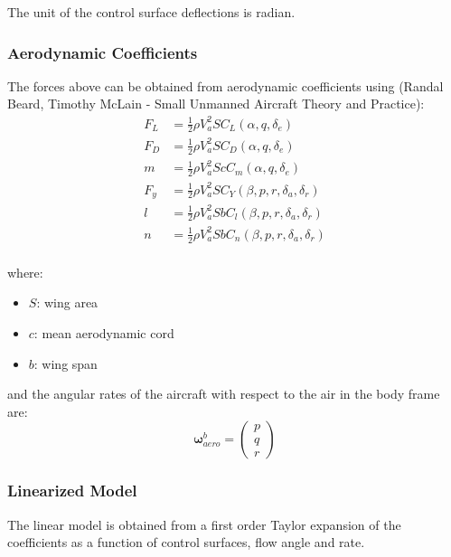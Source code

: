 \documentclass[a4paper]{paper}
\begin{document}
The unit of the control surface deflections is radian.

\subsubsection{Aerodynamic Coefficients}

The forces above can be obtained from aerodynamic coefficients using (Randal Beard, Timothy McLain - Small Unmanned Aircraft Theory and Practice):
\begin{equation}
\begin{split}
    F_L &= \frac{1}{2} \rho V_a^2 S C_L(\alpha, q, \delta_e) \\
    F_D &= \frac{1}{2} \rho V_a^2 S C_D(\alpha, q, \delta_e) \\
    m &= \frac{1}{2} \rho V_a^2 S c C_m(\alpha, q, \delta_e) \\
    F_y &= \frac{1}{2} \rho V_a^2 S C_Y(\beta, p, r, \delta_a, \delta_r) \\
    l &= \frac{1}{2} \rho V_a^2 S b C_l(\beta, p, r, \delta_a, \delta_r) \\
    n &= \frac{1}{2} \rho V_a^2 S b C_n(\beta, p, r, \delta_a, \delta_r) \\
\end{split}
\end{equation}

where:
\begin{itemize}
    \item $S$: wing area
    \item $c$: mean aerodynamic cord
    \item $b$: wing span
\end{itemize}
and the angular rates of the aircraft with respect to the air in the body frame are:
\begin{equation}
    \bm \omega_{aero}^b = \left(\begin{matrix}
    p\\ q \\ r
    \end{matrix}\right)
\end{equation}

\subsubsection{Linearized Model}

The linear model is obtained from a first order Taylor expansion of the coefficients as a function of control surfaces, flow angle and rate.
\end{document}
